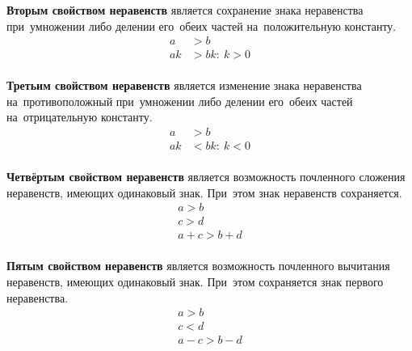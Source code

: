 \documentclass[]{scrartcl}
\begin{document}
\textbf{Вторым свойством неравенств} является сохранение знака неравенства при~умножении либо делении его~обеих частей на~положительную константу.
\begin{equation}\label{eq:enequalities-property2}
\begin{aligned}
a&>b \\
ak&>bk:\ k>0\\
\end{aligned}
\end{equation}

\textbf{Третьим свойством неравенств} является изменение знака неравенства на~противоположный при~умножении либо делении его~обеих частей на~отрицательную константу.
\begin{equation}\label{eq:enequalities-property3}
\begin{aligned}
a&>b \\
ak&<bk:\ k<0\\
\end{aligned}
\end{equation}

\textbf{Четвёртым свойством неравенств} является возможность почленного сложения неравенств, имеющих одинаковый знак. При~этом знак неравенств сохраняется.
\begin{equation}\label{eq:enequalities-property4}
\begin{aligned}
a>b \\
c>d \\
a+c>b+d\\
\end{aligned}
\end{equation}

\textbf{Пятым свойством неравенств} является возможность почленного вычитания неравенств, имеющих одинаковый знак. При~этом сохраняется знак первого неравенства.
\begin{equation}\label{eq:enequalities-property5}
\begin{aligned}
a>b \\
c<d \\
a-c>b-d\\
\end{aligned}
\end{equation}
\end{document}
